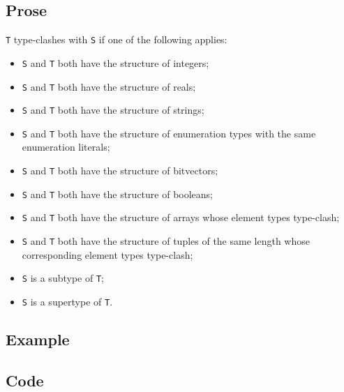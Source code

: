 \documentclass{book}
\begin{document}
  \subsection{Prose}
  \texttt{T} type-clashes with \texttt{S} if one of the following applies:
  \begin{itemize}
  \item \texttt{S} and \texttt{T} both have the structure of integers;
  \item \texttt{S} and \texttt{T} both have the structure of reals;
  \item \texttt{S} and \texttt{T} both have the structure of strings;
  \item \texttt{S} and \texttt{T} both have the structure of enumeration types with the same enumeration literals;
  \item \texttt{S} and \texttt{T} both have the structure of bitvectors;
  \item \texttt{S} and \texttt{T} both have the structure of booleans;
  \item \texttt{S} and \texttt{T} both have the structure of arrays whose element types type-clash;
  \item \texttt{S} and \texttt{T} both have the structure of tuples of the same length whose
    corresponding element types type-clash;
  \item \texttt{S} is a subtype of \texttt{T};
  \item \texttt{S} is a supertype of \texttt{T}.
  \end{itemize}

  \subsection{Example}

  \subsection{Code}
\end{document}
